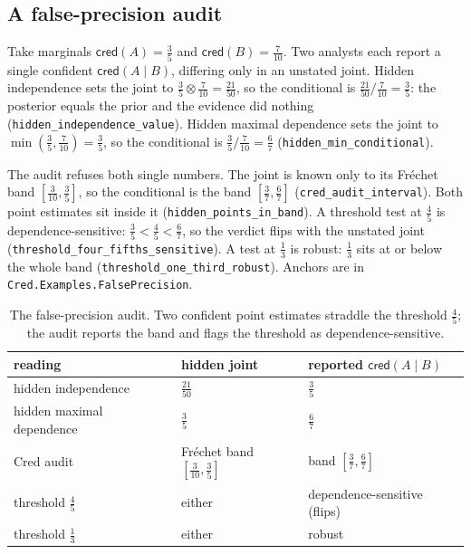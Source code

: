 \documentclass[11pt,a4paper]{article}
\newcommand{\cred}{\mathsf{cred}}
\newcommand{\conjc}{\otimes}
\newcommand{\Lean}[1]{\texttt{#1}}
\begin{document}
\subsection{A false-precision audit}
\label{sec:false-precision}

Take marginals $\cred(A)=\tfrac35$ and $\cred(B)=\tfrac{7}{10}$.  Two
analysts each report a single confident $\cred(A\mid B)$, differing only
in an unstated joint.  Hidden independence sets the joint to
$\tfrac35\conjc\tfrac{7}{10}=\tfrac{21}{50}$, so the conditional is
$\tfrac{21}{50}\big/\tfrac{7}{10}=\tfrac35$: the posterior equals the
prior and the evidence did nothing
(\Lean{hidden\_independence\_value}).  Hidden maximal dependence sets the
joint to $\min(\tfrac35,\tfrac{7}{10})=\tfrac35$, so the conditional is
$\tfrac35\big/\tfrac{7}{10}=\tfrac67$ (\Lean{hidden\_min\_conditional}).

The audit refuses both single numbers.  The joint is known only to its
Fr\'echet band $[\tfrac{3}{10},\tfrac35]$, so the conditional is the band
$[\tfrac37,\tfrac67]$ (\Lean{cred\_audit\_interval}).  Both point
estimates sit inside it (\Lean{hidden\_points\_in\_band}).  A threshold
test at $\tfrac45$ is dependence-sensitive: $\tfrac35<\tfrac45<\tfrac67$,
so the verdict flips with the unstated joint
(\Lean{threshold\_four\_fifths\_sensitive}).  A test at $\tfrac13$ is
robust: $\tfrac13$ sits at or below the whole band
(\Lean{threshold\_one\_third\_robust}).  Anchors are in
\texttt{Cred.Examples.FalsePrecision}.

\begin{table}[h]
\centering
\footnotesize
\begin{tabular}{@{}lll@{}}
\toprule
reading & hidden joint & reported $\cred(A\mid B)$ \\
\midrule
hidden independence & $\tfrac{21}{50}$ & $\tfrac35$ \\
hidden maximal dependence & $\tfrac35$ & $\tfrac67$ \\
Cred audit & Fr\'echet band $[\tfrac{3}{10},\tfrac35]$ & band $[\tfrac37,\tfrac67]$ \\
\midrule
threshold $\tfrac45$ & either & dependence-sensitive (flips) \\
threshold $\tfrac13$ & either & robust \\
\bottomrule
\end{tabular}
\caption{The false-precision audit.  Two confident point estimates
straddle the threshold $\tfrac45$; the audit reports the band and flags
the threshold as dependence-sensitive.}
\label{tab:false-precision}
\end{table}
\end{document}
